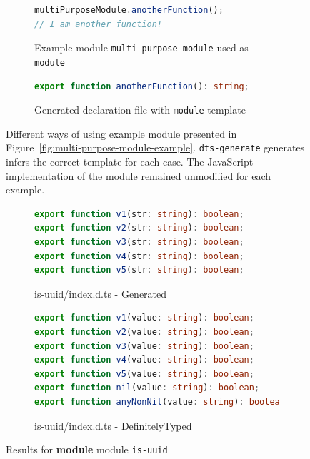 \documentclass[english,cleveref,autoref,submission]{programming}
\newcommand{\figref}[1]{Figure~\ref{#1}}
\begin{document}
\begin{figure}[tp]
\begin{subfigure}{0.48\linewidth}
\begin{lstlisting}[language=JavaScript]
multiPurposeModule.anotherFunction();
// I am another function!
      \end{lstlisting}
      \caption{Example module \texttt{multi-purpose-module} used as \texttt{module}}
    \end{subfigure}
    \hfill
    \begin{subfigure}{0.48\linewidth}
      \begin{lstlisting}[language=TypeScript]
export function anotherFunction(): string;
      \end{lstlisting}
      \caption{Generated declaration file with \texttt{module} template}
    \end{subfigure}

  \caption{Different ways of using example module presented in \figref{fig:multi-purpose-module-example}. \texttt{dts-generate} generates infers the correct template for each case. The JavaScript implementation of the module remained unmodified for each example.}
  \label{fig:dts-generate-choose-templates}
\end{figure}


\begin{figure}[tp]
  \centering
  \begin{subfigure}{0.48\linewidth}
    \begin{lstlisting}[language=TypeScript]
export function v1(str: string): boolean;
export function v2(str: string): boolean;
export function v3(str: string): boolean;
export function v4(str: string): boolean;
export function v5(str: string): boolean;
    \end{lstlisting}
    \caption{is-uuid/index.d.ts - Generated}
  \end{subfigure}
  \hfill
  \begin{subfigure}{0.48\linewidth}
    \begin{lstlisting}[language=TypeScript]
export function v1(value: string): boolean;
export function v2(value: string): boolean;
export function v3(value: string): boolean;
export function v4(value: string): boolean;
export function v5(value: string): boolean;
export function nil(value: string): boolean;
export function anyNonNil(value: string): boolean;
    \end{lstlisting}
    \caption{is-uuid/index.d.ts - DefinitelyTyped}
  \end{subfigure}

  \caption{Results for \textbf{module}  module \texttt{is-uuid}}
  \label{fig:experiments-results-module-is-uuid}
\end{figure}
\end{document}
